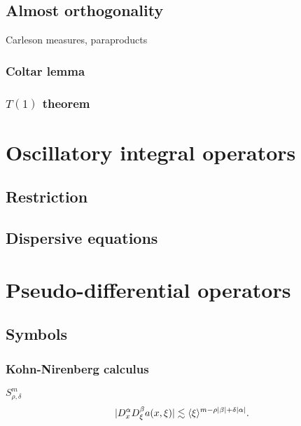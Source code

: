\documentclass{../../large}
\begin{document}
\chapter{Almost orthogonality}
Carleson measures, paraproducts
\section{Coltar lemma}
\section{$T(1)$ theorem}




\part{Oscillatory integral operators}


\chapter{}
\chapter{Restriction}
\chapter{Dispersive equations}








\part{Pseudo-differential operators}


\chapter{Symbols}
\section{Kohn-Nirenberg calculus}
$S_{\rho,\delta}^m$
\[|D_x^\alpha D_\xi^\beta a(x,\xi)|\lesssim\langle\xi\rangle^{m-\rho|\beta|+\delta|\alpha|}.\]
\end{document}
